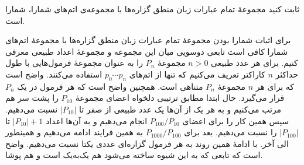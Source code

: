 ثابت کنید مجموعهٔ تمام عبارات زبان منطق گزاره‌ها با مجموعه‌ی اتم‌های شمارا، شمارا است.
\begin{ans}
  برای اثبات شمارا بودن مجموعهٔ تمام عبارات زبان منطق گزاره‌ها با مجموعهٔ اتم‌های شمارا کافی است تابعی دوسویی میان این مجموعه و مجموعهٔ اعداد طبیعی معرفی کنیم. برای هر عدد طبیعی 
  $n>0$
  مجموعهٔ
  $P_n$
  را به عنوان مجموعهٔ فرمول‌هایی با طول حداکثر $n$ کاراکتر تعریف می‌کنیم که تنها از اتم‌های
  $p_0\cdots p_n$
  استفاده می‌کنند. واضح است که برای هر $n$ مجموعهٔ $P_n$ متناهی است. همچنین واضح است که هر فرمول در یک $P_n$ قرار می‌گیرد.
  حال ابتدا مطابق ترتیبی دلخواه اعضای مجموعهٔ
  $P_{10}$
  را پشت سر هم مرتب می‌کنیم و به هر یک از آن‌ها یک عدد طبیعی از صفر تا $|P_{10}|$ نسبت می‌دهیم. سپس همین کار را برای اعضای $P_{100}/P_{10}$ انجام می‌دهیم و به آن‌ها اعداد $|P_{10}|+1$ تا $|P_{100}|$ را نسبت می‌دهیم. بعد برای $P_{1000}/P_{100}$ به همین فرایند ادامه می‌دهیم و همینطور الی آخر. با ادامهٔ همین روند به هر فرمول گزاره‌ای عددی یکتا نسبت می‌دهیم. واضح است که تابعی که به این شیوه ساخته می‌شود هم یک‌به‌یک است و هم پوشا.
\end{ans}
